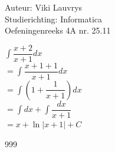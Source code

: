 \documentclass[a4paper]{article}
\begin{document}
  
\noindent \large Auteur: Viki	Lauvrys \\
\noindent \large Studierichting: Informatica\\
\noindent \large Oefeningenreeks 4A nr. 25.11\\

\medskip

\normalsize

$ \displaystyle\int \dfrac{x+2}{x+1} dx $ \\

$ = \displaystyle\int \dfrac{x+1 +1}{x+1} dx $ \\

$ = \displaystyle\int \left( 1 + \dfrac{1}{x+1} \right) dx $ \\

$ = \displaystyle\int dx + \displaystyle\int \dfrac{dx}{x+1} $ \\

$ = x + \ln|x+1|+C $ \\


\begin{thebibliography}{999}
\end{thebibliography}
\end{document}
